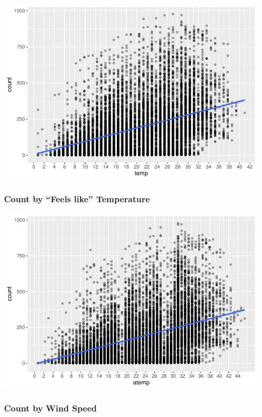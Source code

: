 \documentclass[american,]{article}
\begin{document}
\includegraphics{BikeSharingDemand_files/figure-latex/train.mod.1.temp-1.pdf}

\newpage

\hypertarget{count-by-feels-like-temperature}{%
\subsubsection{Count by ``Feels like'' Temperature}\label{count-by-feels-like-temperature}}

\includegraphics{BikeSharingDemand_files/figure-latex/train.mod.1.atemp-1.pdf}

\newpage

\hypertarget{count-by-wind-speed}{%
\subsubsection{Count by Wind Speed}\label{count-by-wind-speed}}
\end{document}
